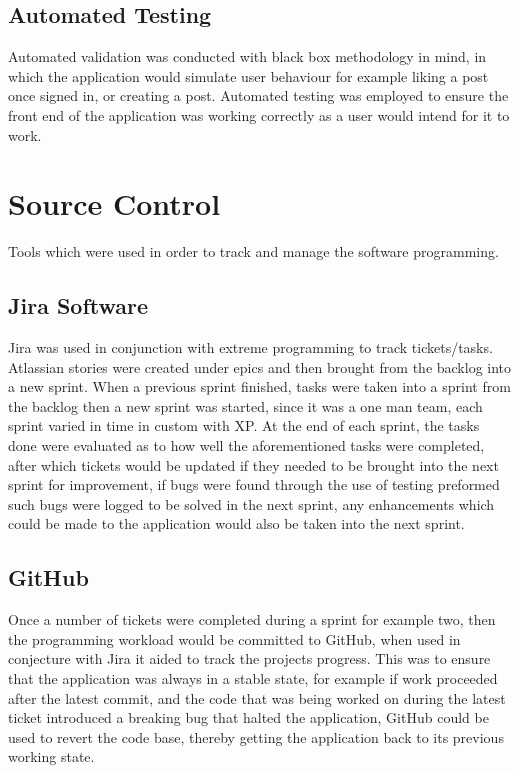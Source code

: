 \subsection{Automated Testing}
Automated validation was conducted with black box methodology in mind, in which the application would simulate user behaviour for example liking a post once signed in, or creating a post. Automated testing was employed to ensure the front end of the application was working correctly as a user would intend for it to work.

\section{Source Control}
Tools which were used in order to track and manage the software programming.

\subsection{Jira Software}
Jira was used in conjunction with extreme programming to track tickets/tasks. Atlassian stories were created under epics and then brought from the backlog into a new sprint. When a previous sprint finished, tasks were taken into a sprint from the backlog then a new sprint was started, since it was a one man team, each sprint varied in time in custom with XP. At the end of each sprint, the tasks done were evaluated as to how well the aforementioned tasks were completed, after which tickets would be updated if they needed to be brought into the next sprint for improvement, if bugs were found through the use of testing preformed such bugs were logged to be solved in the next sprint, any enhancements which could be made to the application would also be taken into the next sprint.

\subsection{GitHub}
Once a number of tickets were completed during a sprint for example two, then the programming workload would be committed to GitHub, when used in conjecture with Jira it aided to track the projects progress. This was to ensure that the application was always in a stable state, for example if work proceeded after the latest commit, and the code that was being worked on during the latest ticket introduced a breaking bug that halted the application, GitHub could be used to revert the code base, thereby getting the application back to its previous working state. 

